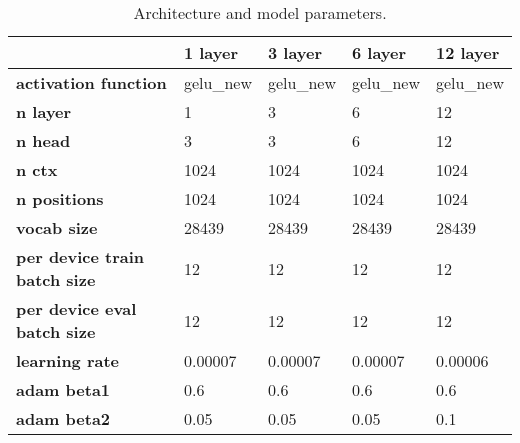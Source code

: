 \begin{table}
\centering
\caption{Architecture and model parameters.}
\label{tab:model-train-info}
\begin{tabular}{lllll}
\toprule
{} &   1 layer &   3 layer &   6 layer &  12 layer \\
\midrule
\textbf{activation function        } &  gelu\_new &  gelu\_new &  gelu\_new &  gelu\_new \\
\textbf{n layer                    } &         1 &         3 &         6 &        12 \\
\textbf{n head                     } &         3 &         3 &         6 &        12 \\
\textbf{n ctx                      } &      1024 &      1024 &      1024 &      1024 \\
\textbf{n positions                } &      1024 &      1024 &      1024 &      1024 \\
\textbf{vocab size                 } &     28439 &     28439 &     28439 &     28439 \\
\textbf{per device train batch size} &        12 &        12 &        12 &        12 \\
\textbf{per device eval batch size } &        12 &        12 &        12 &        12 \\
\textbf{learning rate              } &   0.00007 &   0.00007 &   0.00007 &   0.00006 \\
\textbf{adam beta1                 } &       0.6 &       0.6 &       0.6 &       0.6 \\
\textbf{adam beta2                 } &      0.05 &      0.05 &      0.05 &       0.1 \\
\bottomrule
\end{tabular}
\end{table}

